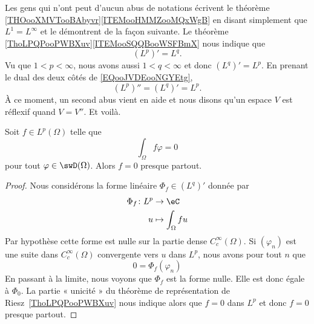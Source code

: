 \begin{normaltext}
Les gens qui n'ont peut d'aucun abus de notations écrivent le théorème \ref{THOooXMVTooBAbyvr}\ref{ITEMooHMMZooMQxWgB} en disant simplement que \( L^1=L^{\infty}\) et le démontrent de la façon suivante. Le théorème \ref{ThoLPQPooPWBXuv}\ref{ITEMooSQQBooWSFBmX} nous indique que
\begin{equation}        \label{EQooJVDEooNGYEtg}
    (L^p)'=L^q.
\end{equation}
Vu que \( 1<p<\infty\), nous avons aussi \( 1<q<\infty\) et donc \( (L^q)'=L^p\). En prenant le dual des deux côtés de \eqref{EQooJVDEooNGYEtg},
\begin{equation}
    (L^p)''=(L^q)'=L^p.
\end{equation}
À ce moment, un second abus vient en aide et nous disons qu'un espace \( V\) est réflexif quand \( V=V''\). Et voilà.
\end{normaltext}


\begin{proposition} \label{PropUKLZZZh}
Soit \( f\in L^p(\Omega)\) telle que
\begin{equation}
    \int_{\Omega}f\varphi=0
\end{equation}
pour tout \( \varphi\in \swD(\Omega)\). Alors \( f=0\) presque partout.
\end{proposition}

\begin{proof}
Nous considérons la forme linéaire \( \Phi_f\in (L^q)'\) donnée par
\begin{equation}
    \begin{aligned}
        \Phi_f\colon L^p & \to \eC                 \\
        u                & \mapsto \int_{\Omega}fu
    \end{aligned}
\end{equation}
Par hypothèse cette forme est nulle sur la partie dense \(  C^{\infty}_c(\Omega)\). Si \( (\varphi_n)\) est une suite dans \(  C^{\infty}_c(\Omega)\) convergente vers \( u\) dans \( L^p\), nous avons pour tout \( n\) que
\begin{equation}
    0=\Phi_f(\varphi_n)
\end{equation}
En passant à la limite, nous voyons que \( \Phi_f\) est la forme nulle. Elle est donc égale à \( \Phi_0\). La partie « unicité » du théorème de représentation de Riesz~\ref{ThoLPQPooPWBXuv} nous indique alors que \( f=0\) dans \( L^p\) et donc \( f=0\) presque partout.
\end{proof}

